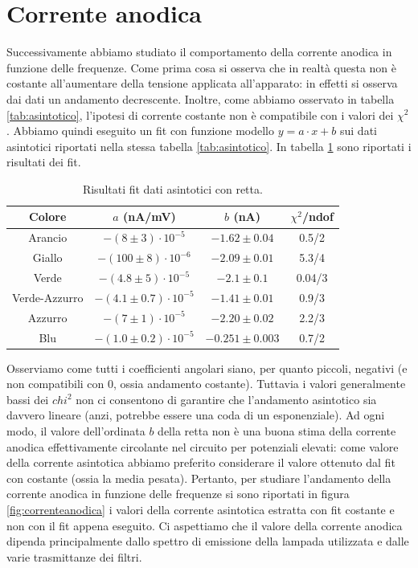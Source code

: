 \documentclass[10pt,a4paper]{article}
\begin{document}
\section{Corrente anodica}
Successivamente abbiamo studiato il comportamento della corrente anodica in funzione delle frequenze.
Come prima cosa si osserva che in realtà questa non è costante all'aumentare della tensione applicata all'apparato: in effetti si osserva dai dati un andamento decrescente. Inoltre, come abbiamo osservato in tabella \ref{tab:asintotico}, l'ipotesi di corrente costante non è compatibile con i valori dei $\chi ^2$. Abbiamo quindi eseguito un fit con funzione modello $y = a \cdot x + b$ sui dati asintotici riportati nella stessa tabella \ref{tab:asintotico}.
In tabella \ref{tab:fitasintoticoretta} sono riportati i risultati dei fit.
\begin{table}[!htb]
\centering
\begin{tabular}{|c|c|c|c|}
\hline
Colore & $a$ (nA/mV) & $b$ (nA) & $\chi ^2$/ndof\\
\hline
Arancio & $-(8\pm 3)\cdot 10 ^ {-5}$ & $-1.62 \pm 0.04$ & 0.5/2\\
\hline
Giallo & $-(100\pm 8)\cdot 10 ^ {-6}$ & $-2.09\pm0.01$ & 5.3/4\\
\hline
Verde & $-(4.8\pm 5)\cdot 10 ^ {-5}$ & $-2.1\pm 0.1$ & 0.04/3\\
\hline
Verde-Azzurro & $-(4.1\pm0.7)\cdot 10 ^ {-5}$ & $-1.41\pm0.01$ & 0.9/3\\
\hline
Azzurro & $-(7\pm 1)\cdot 10 ^ {-5}$ & $-2.20\pm 0.02$ & 2.2/3\\
\hline
Blu & $-(1.0\pm 0.2)\cdot 10 ^ {-5}$ & $-0.251\pm 0.003$ & 0.7/2\\ 
\hline
\end{tabular}
\caption{Risultati fit dati asintotici con retta.\label{tab:fitasintoticoretta}}
\end{table}
Osserviamo come tutti i coefficienti angolari siano, per quanto piccoli, negativi (e non compatibili con 0, ossia andamento costante).
Tuttavia i valori generalmente bassi dei $chi ^2$ non ci consentono di garantire che l'andamento asintotico sia davvero lineare (anzi, potrebbe essere una coda di un esponenziale). 
Ad ogni modo, il valore dell'ordinata $b$ della retta non è una buona stima della corrente anodica effettivamente circolante nel circuito per potenziali elevati: come valore della corrente asintotica abbiamo preferito considerare il valore ottenuto dal fit con costante (ossia la media pesata). 
Pertanto, per studiare l'andamento della corrente anodica in funzione delle frequenze si sono riportati in figura \ref{fig:correnteanodica} i valori della corrente asintotica estratta con fit costante e non con il fit appena eseguito. Ci aspettiamo che il valore della corrente anodica dipenda principalmente dallo spettro di emissione della lampada utilizzata e dalle varie trasmittanze dei filtri.
\end{document}
